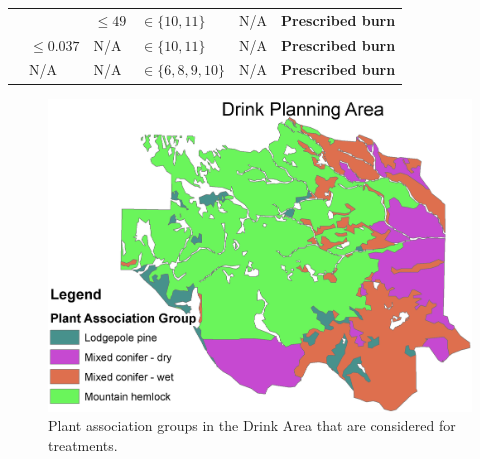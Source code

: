 \begin{longtable}{p{.1\linewidth}p{.1\linewidth}p{.15\linewidth}p{.15\linewidth}p{.2\linewidth}p{.25\linewidth}}
                                  & \multicolumn{1}{c}{}                                   & $ \le 49$                                        & $\in \{10,11\}$               & N/A                                                                                                     & \textbf{Prescribed burn}                                                          \\ \cline{2-6} 
                                  & $\le 0.037$                                        & N/A                                                 & $\in \{10,11\}$               & N/A                                                                                                     & \textbf{Prescribed burn}                                                          \\ \cline{2-6} 
                                  & N/A                                                    & N/A                                                 & $\in \{6,8,9,10\}$            & N/A                                                                                                     & \textbf{Prescribed burn}\footnotemark[\ref{footnote:p2TrtNote}] \\
\end{longtable}

\begin{figure}
\centering
\includegraphics[width=.5\textwidth]{../images/DrinkMap_PAGs}
\caption[Plant association groups in the Drink Planning Area]{Plant association groups in the Drink Area that are considered for treatments.}
\label{fig:drinkPAGs}
\end{figure}